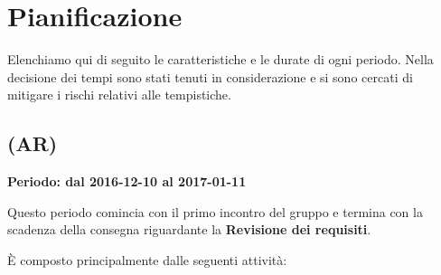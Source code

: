 \documentclass[./PianoDiProgetto.tex]{subfiles}
\begin{document}
\section{Pianificazione}
  Elenchiamo qui di seguito le caratteristiche e le durate di ogni periodo. Nella decisione dei tempi sono stati tenuti in considerazione e si sono cercati di mitigare i rischi relativi alle tempistiche.
	\subsection{\PerAR{} (AR)}
  \textbf{Periodo: dal 2016-12-10 al 2017-01-11}

  Questo periodo comincia con il primo incontro del gruppo e termina con la scadenza della consegna riguardante la \textbf{Revisione dei requisiti}.

  È composto principalmente dalle seguenti attività:
\end{document}
